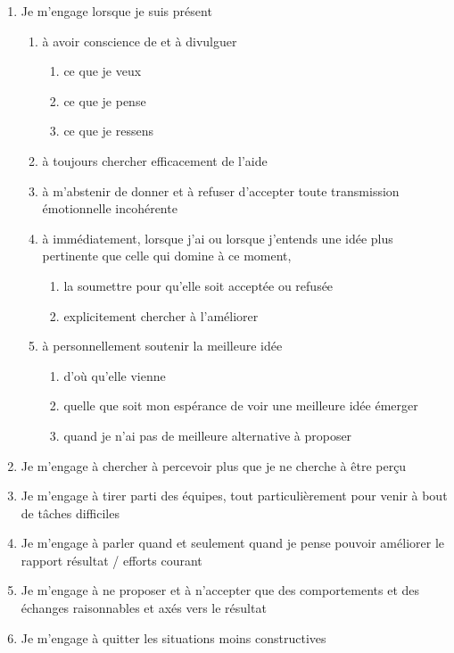 \documentclass[11pt]{book}
\begin{document}
\begin{enumerate}
	\item Je m'engage lorsque je suis présent
	\begin{enumerate}
		\item à avoir conscience de et à divulguer
		\begin{enumerate}
			\item ce que je veux
			\item ce que je pense
			\item ce que je ressens
		\end{enumerate}
		\item à toujours chercher efficacement de l'aide
		\item à m'abstenir de donner et à refuser d'accepter toute transmission émotionnelle incohérente
		\item à immédiatement, lorsque j'ai ou lorsque j'entends une idée plus pertinente que celle qui domine
		      à ce moment,
		\begin{enumerate}
			\item la soumettre pour qu'elle soit acceptée ou refusée
			\item explicitement chercher à l'améliorer
		\end{enumerate}
		\item à personnellement soutenir la meilleure idée
		\begin{enumerate}
			\item d'où qu'elle vienne
			\item quelle que soit mon espérance de voir une meilleure idée émerger
			\item quand je n'ai pas de meilleure alternative à proposer
		\end{enumerate}
	\end{enumerate}
	\item Je m'engage à chercher à percevoir plus que je ne cherche à être perçu
	\item Je m'engage à tirer parti des équipes, tout particulièrement pour venir à bout de tâches difficiles
	\item Je m'engage à parler quand et seulement quand je pense pouvoir améliorer le rapport résultat / efforts courant
	\item Je m'engage à ne proposer et à n'accepter que des comportements et des échanges raisonnables et axés vers le résultat
	\item Je m'engage à quitter les situations moins constructives
	\begin{enumerate}

\end{enumerate}
\end{enumerate}
\end{document}
